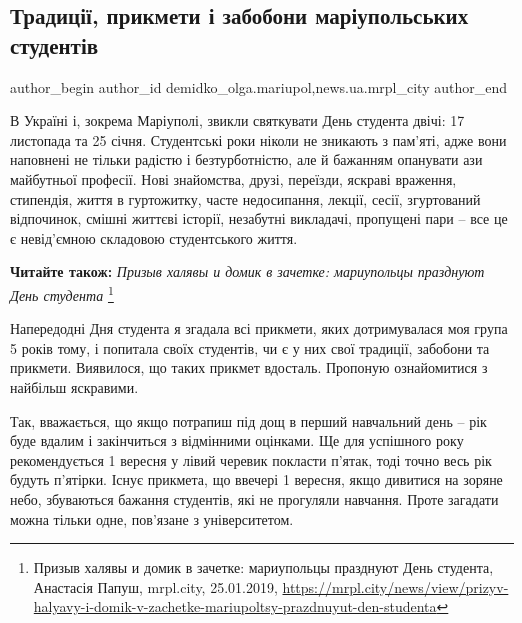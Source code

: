  
 
 
 
 
 
\subsection{Традиції, прикмети і забобони маріупольських студентів}
\label{sec:25_01_2019.stz.news.ua.mrpl_city.1.tradycii_prykmety_zabobony_studenty}
 
\ifcmt
 author_begin
   author_id demidko_olga.mariupol,news.ua.mrpl_city
 author_end
\fi


В Україні і, зокрема Маріуполі, звикли святкувати День студента двічі: 17
листопада та 25 січня. Студентські роки ніколи не зникають з пам'яті, адже вони
наповнені не тільки радістю і безтурботністю, але й бажанням опанувати ази
майбутньої професії. Нові знайомства, друзі, переїзди, яскраві враження,
стипендія, життя в гуртожитку, часте недосипання, лекції, сесії, згуртований
відпочинок, смішні життєві історії, незабутні викладачі, пропущені пари – все
це є невід'ємною складовою студентського життя.

\textbf{Читайте також:} \emph{Призыв халявы и домик в зачетке: мариупольцы празднуют День студента}%
\footnote{Призыв халявы и домик в зачетке: мариупольцы празднуют День студента, Анастасія Папуш, mrpl.city, 25.01.2019, %
\url{https://mrpl.city/news/view/prizyv-halyavy-i-domik-v-zachetke-mariupoltsy-prazdnuyut-den-studenta}%
}

Напередодні Дня студента я згадала всі прикмети, яких дотримувалася моя група 5
років тому, і попитала своїх студентів, чи є у них свої традиції, забобони та
прикмети. Виявилося, що таких прикмет вдосталь. Пропоную ознайомитися з
найбільш яскравими.

Так, вважається, що якщо потрапиш під дощ в перший навчальний день – рік буде
вдалим і закінчиться з відмінними оцінками. Ще для успішного року
рекомендується 1 вересня у лівий черевик покласти п'ятак, тоді точно весь рік
будуть п'ятірки. Існує прикмета, що ввечері 1 вересня, якщо дивитися на зоряне
небо, збуваються бажання студентів, які не прогуляли навчання. Проте загадати
можна тільки одне, пов'язане з університетом.

